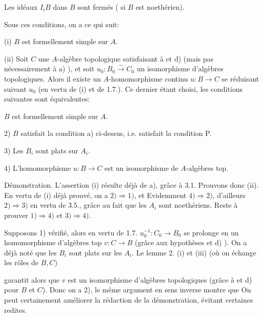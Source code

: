  Les idéaux $I_iB$ dans $B$ sont fermés ( si $B$ est noethérien).

Sous ces conditions, on a ce qui suit:

(i) $B$ est formellement simple sur $A$.

(ii) Soit $C$ une $A$-algèbre topologique satisfaisant à  et d)
(mais pas nécessairement à a) ), et soit $u_0:B_0\xrightarrow{\sim}C_0$ un isomorphisme
d'algèbres topologiques. Alors il existe un $A$-homomorphisme continu
$u:B\longrightarrow C$ se réduisant suivant $u_0$ (en vertu de (i) et de 1.7.). Ce
dernier étant choisi, les conditions suivantes sont équivalentes: 

 $B$ est formellement simple sur $A$.

2)  $B$ satisfait la condition a) ci-dessus, i.e.  satisfait
la condition P.

3) Les $B_i$ sont plats sur $A_i$.

4) L'homomorphisme $u:B\longrightarrow C$ est un isomorphisme\deleted{\unsure{,}} de $A$-algèbres top.


Démonstration. L'assertion (i) résulte déjà de a), grâce à 3.1.
Prouvons donc (ii). En vertu de (i) déjà prouvé, on a $2)\Longrightarrow1)$, et
Evidemment $4)\Longrightarrow2)$, d'ailleurs $2)\Longrightarrow3)$ en vertu de 3.5., grâce au
fait que les $A_i$ sont noethériens. Reste à prouver $1)\Longrightarrow4)$ et $3)\Longrightarrow4)$.

Supposons 1) vérifié, alors en vertu de 1.7. $u_0^{-1}:C_0\longrightarrow B_0$
se prolonge en un homomorphisme d'algèbres top $v:C\longrightarrow B$ (grâce aux
hypothèses  et d) ). On a déjà noté que les $B_i$ sont plats sur les
$A_i$. Le lemme 2. (i) et (iii) (où on échange les rôles de $B,C$)



garantit alors que $v$ est un isomorphisme d'algèbres topologiques (grâce
à  et d) pour $B$ et $C$). Donc  on a 2), 
 le même argument en
sens inverse montre que  
On peut certainement améliorer la rédaction de la démonstration, évitant certaines redites.


